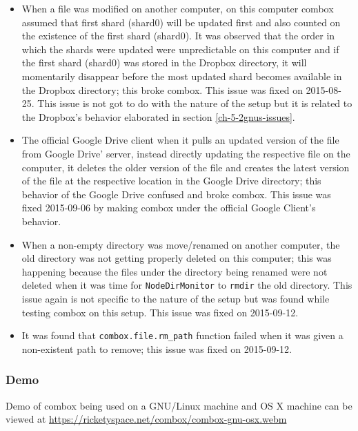\begin{itemize}
\item When a file was modified on another computer, on this computer
  combox assumed that first shard (shard0) will be updated first and
  also counted on the existence of the first shard (shard0). It was
  observed that the order in which the shards were updated were
  unpredictable on this computer and if the first shard (shard0) was
  stored in the Dropbox directory, it will momentarily disappear
  before the most updated shard becomes available in the Dropbox
  directory; this broke combox. This issue was fixed on
  2015-08-25\cite{git:bug-four-fix}. This issue is not got to do with
  the nature of the setup but it is related to the Dropbox's behavior
  elaborated in section \ref{ch-5-2gnus-issues}.
\item The official Google Drive client when it pulls an updated
  version of the file from Google Drive' server, instead directly
  updating the respective file on the computer, it deletes the older
  version of the file and creates the latest version of the file at
  the respective location in the Google Drive directory; this behavior
  of the Google Drive confused and broke combox. This issue was fixed
  2015-09-06 by making combox under the official Google Client's
  behavior\cite{git:bug-googledc-fix}.
\item When a non-empty directory was move/renamed on another computer,
  the old directory was not getting properly deleted on this computer;
  this was happening because the files under the directory being
  renamed were not deleted when it was time for \verb+NodeDirMonitor+
  to \verb+rmdir+ the old directory. This issue again is not specific
  to the nature of the setup but was found while testing combox on
  this setup. This issue was fixed on
  2015-09-12\cite{git:bug-six-fix}.
\item It was found that \verb+combox.file.rm_path+ function failed
  when it was given a non-existent path to remove; this issue was
  fixed on 2015-09-12\cite{git:bug-seven-fix}.
\end{itemize}

\subsubsection{Demo}

Demo of combox being used on a GNU/Linux machine and OS X machine can
be viewed at \url{https://ricketyspace.net/combox/combox-gnu-osx.webm}


